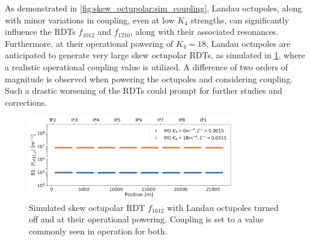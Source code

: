 
As demonstrated in \cref{fig:skew_octupolar:sim_coupling}, Landau octupoles, along with minor
variations in coupling, even at low $K_4$ strengths, can significantly influence the RDTs
$f_{1012}$ and $f_{1210}$, along with their associated resonances. Furthermore, at their
operational powering of $K_4=18$, Landau octupoles are anticipated to generate very large skew
octupolar RDTs, as simulated in \cref{fig:skew_octupolar:mo_full_power_coupling_simulation}, where a
realistic operational coupling value is utilized. A difference of two orders of magnitude is
observed when powering the octupoles and considering coupling.
Such a drastic worsening of the RDTs could prompt for further studies and corrections.

\begin{figure}[!htb]
    \centering
    \includegraphics[width=0.8\textwidth]{./images/skew_octupoles/f1012_AMP_full_mo_with_coupling.pdf}
    \caption{Simulated skew octupolar RDT $f_{1012}$ with Landau octupoles turned off and at their
    operational powering. Coupling is set to a value commonly seen in operation for both.}
    \label{fig:skew_octupolar:mo_full_power_coupling_simulation}
\end{figure}


